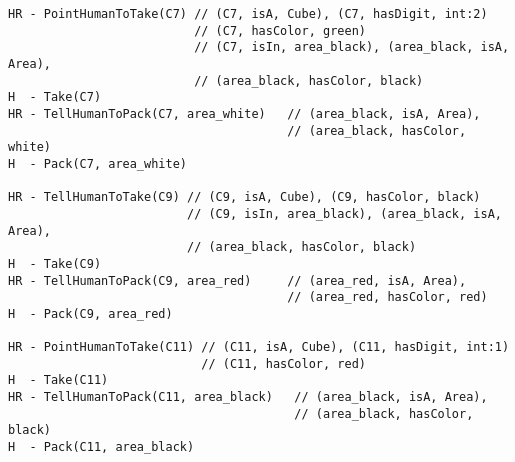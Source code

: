 \begin{lstlisting}
HR - PointHumanToTake(C7) // (C7, isA, Cube), (C7, hasDigit, int:2)
                          // (C7, hasColor, green)
                          // (C7, isIn, area_black), (area_black, isA, Area),
                          // (area_black, hasColor, black)
H  - Take(C7)
HR - TellHumanToPack(C7, area_white)   // (area_black, isA, Area),
                                       // (area_black, hasColor, white)
H  - Pack(C7, area_white)

HR - TellHumanToTake(C9) // (C9, isA, Cube), (C9, hasColor, black)
                         // (C9, isIn, area_black), (area_black, isA, Area),
                         // (area_black, hasColor, black)
H  - Take(C9)
HR - TellHumanToPack(C9, area_red)     // (area_red, isA, Area),
                                       // (area_red, hasColor, red)
H  - Pack(C9, area_red)

HR - PointHumanToTake(C11) // (C11, isA, Cube), (C11, hasDigit, int:1)
                           // (C11, hasColor, red)
H  - Take(C11)
HR - TellHumanToPack(C11, area_black)   // (area_black, isA, Area),
                                        // (area_black, hasColor, black)
H  - Pack(C11, area_black)
\end{lstlisting}

